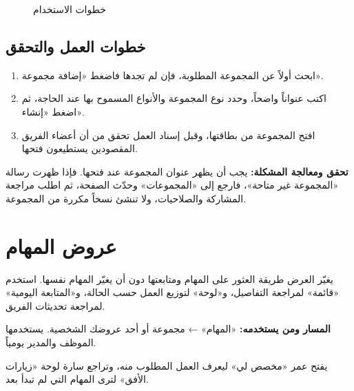 \begin{figure}[H]
\centering
{}
\rclegend
\caption{خطوات الاستخدام}
\label{fig:tasks-collections-flow}
\end{figure}

\subsection{خطوات العمل والتحقق}
\begin{enumerate}
\item ابحث أولاً عن المجموعة المطلوبة، فإن لم تجدها فاضغط «إضافة مجموعة».
\item اكتب عنواناً واضحاً، وحدد نوع المجموعة والأنواع المسموح بها عند الحاجة، ثم اضغط «إنشاء».
\item افتح المجموعة من بطاقتها، وقبل إسناد العمل تحقق من أن أعضاء الفريق المقصودين يستطيعون فتحها.
\end{enumerate}

\textbf{تحقق ومعالجة المشكلة:} يجب أن يظهر عنوان المجموعة عند فتحها. فإذا ظهرت رسالة «المجموعة غير متاحة»، فارجع إلى «المجموعات» وحدّث الصفحة، ثم اطلب مراجعة المشاركة والصلاحيات، ولا تنشئ نسخاً مكررة من المجموعة.

\clearpage
\section{عروض المهام}
\label{sec:tasks-feature-views}

يغيّر العرض طريقة العثور على المهام ومتابعتها دون أن يغيّر المهام نفسها. استخدم «قائمة» لمراجعة التفاصيل، و«لوحة» لتوزيع العمل حسب الحالة، و«المتابعة اليومية» لمراجعة تحديثات الفريق.

\textbf{المسار ومن يستخدمه:} «المهام» ← مجموعة أو أحد عروضك الشخصية. يستخدمها الموظف والمدير يومياً.

\begin{rcnote}
يفتح عمر «مخصص لي» ليعرف العمل المطلوب منه، وتراجع سارة لوحة «زيارات الأفق» لترى المهام التي لم تبدأ بعد.
\end{rcnote}

